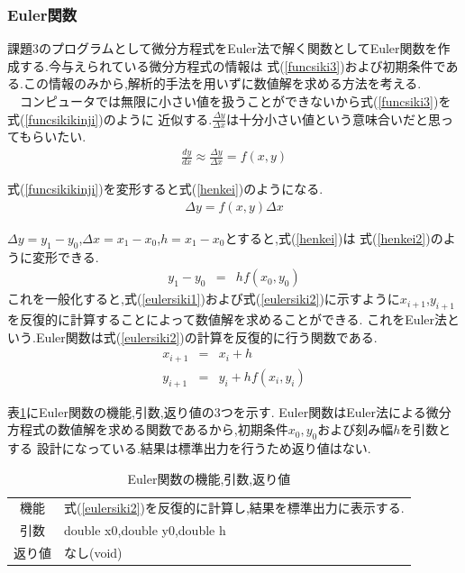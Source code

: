 \documentclass[dvipdfmx]{jarticle}
\begin{document}
      \subsubsection{Euler関数}
      課題3のプログラムとして微分方程式をEuler法で解く関数としてEuler関数を作成する.今与えられている微分方程式の情報は
      式(\ref{funcsiki3})および初期条件である.この情報のみから,解析的手法を用いずに数値解を求める方法を考える.\\
      　コンピュータでは無限に小さい値を扱うことができないから式(\ref{funcsiki3})を式(\ref{funcsikikinji})のように
      近似する.$\frac{\Delta y}{\Delta x}$は十分小さい値という意味合いだと思ってもらいたい.
      \begin{eqnarray}
        \frac{dy}{dx} \approx \frac{\Delta y}{\Delta x} = f(x,y)
            \label{funcsikikinji}
      \end{eqnarray}

      式(\ref{funcsikikinji})を変形すると式(\ref{henkei})のようになる.
      \begin{eqnarray}
        \Delta y = f(x,y)\Delta x
            \label{henkei}
      \end{eqnarray}
    
      $\Delta y=y_1-y_0$,$\Delta x=x_1-x_0$,$h=x_1-x_0$とすると,式(\ref{henkei})は
      式(\ref{henkei2})のように変形できる.
      \begin{eqnarray}
        y_1 -y_0 &=& h f(x_0,y_0) 
            \label{henkei2}
      \end{eqnarray}
      これを一般化すると,式(\ref{eulersiki1})および式(\ref{eulersiki2})に示すように$x_{i+1}$,$y_{i+1}$を反復的に計算することによって数値解を求めることができる.
      これをEuler法という.Euler関数は式(\ref{eulersiki2})の計算を反復的に行う関数である.
      \begin{eqnarray}
        x_{i+1} &=& x_i+h \label{eulersiki1}\\
        y_{i+1} &=& y_i + hf(x_i,y_i)
            \label{eulersiki2}
      \end{eqnarray}

      表\ref{Eulertable}にEuler関数の機能,引数,返り値の3つを示す.
      Euler関数はEuler法による微分方程式の数値解を求める関数であるから,初期条件$x_0,y_0$および刻み幅$h$を引数とする
      設計になっている.結果は標準出力を行うため返り値はない.
  
        \begin{table}[H]
        \caption{Euler関数の機能,引数,返り値}
        \label{Eulertable}
        \begin{center}
            \begin{tabular}{c|l}\hline
          機能 & 式(\ref{eulersiki2})を反復的に計算し,結果を標準出力に表示する.\\
          引数 & double x0,double y0,double h \\
          返り値 & なし(void) \\ \hline
            \end{tabular}
        \end{center}
        \end{table}
\end{document}
